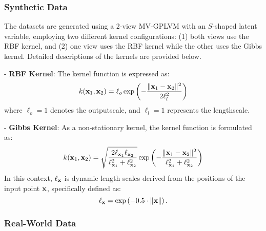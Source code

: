 \subsubsection{Synthetic Data}
\label{app:Synthetic_Data}

The datasets are generated using a 2-view MV-GPLVM with an $S$-shaped latent variable, employing two different kernel configurations: (1) both views use the \MakeUppercase{rbf} kernel, and (2) one view uses the \MakeUppercase{rbf} kernel while the other uses the Gibbs kernel. Detailed descriptions of the kernels are provided below. 

- \textbf{RBF Kernel}: The kernel function is expressed as: 
  \[
  k({\mathbf x}_1, {\mathbf x}_2) = \ell_o \exp\left(-\frac{\|{\mathbf x}_1 - {\mathbf x}_2 \|^2}{2\ell_l^2}\right)
  \]
  where \(\ell_o = 1\) denotes the outputscale, and \(\ell_l = 1\) represents the lengthscale.

- \textbf{Gibbs Kernel}: As a non-stationary kernel, the kernel function is formulated as: 
  \[
  k({\mathbf x}_1, {\mathbf x}_2) = \sqrt{\frac{2 \ell_{{\mathbf x}_1} \ell_{{\mathbf x}_2}}{\ell_{{\mathbf x}_1}^2 + \ell_{{\mathbf x}_2}^2}} \exp\left(-\frac{\|{\mathbf x}_1 - {\mathbf x}_2\|^2}{\ell_{{\mathbf x}_1}^2 + \ell_{{\mathbf x}_2}^2}\right)
  \]
  In this context, \(\ell_{\mathbf x}\) is dynamic length scales derived from the positions of the input point \({\mathbf x}\), specifically defined as:
  \[
  \ell_{{\mathbf x}} = \exp\left(-0.5 \cdot \|{\mathbf x}\|\right).
  \]


\subsubsection{Real-World Data}
\label{app:real_dataset_description}


\begin{table*}[h!]
\caption{Description of real-world datasets. \vspace{-.1in}}
\label{table:dataset_description}
\centering
% 
\setlength{\tabcolsep}{4.0mm}
{
} 
\end{table*}


